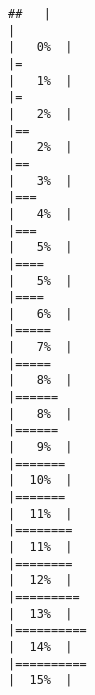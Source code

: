 \documentclass[
]{article}
\begin{document}
\begin{verbatim}
##   |                                                                              |                                                                      |   0%  |                                                                              |=                                                                     |   1%  |                                                                              |=                                                                     |   2%  |                                                                              |==                                                                    |   2%  |                                                                              |==                                                                    |   3%  |                                                                              |===                                                                   |   4%  |                                                                              |===                                                                   |   5%  |                                                                              |====                                                                  |   5%  |                                                                              |====                                                                  |   6%  |                                                                              |=====                                                                 |   7%  |                                                                              |=====                                                                 |   8%  |                                                                              |======                                                                |   8%  |                                                                              |======                                                                |   9%  |                                                                              |=======                                                               |  10%  |                                                                              |=======                                                               |  11%  |                                                                              |========                                                              |  11%  |                                                                              |========                                                              |  12%  |                                                                              |=========                                                             |  13%  |                                                                              |==========                                                            |  14%  |                                                                              |==========                                                            |  15%  |                                                                              
\end{verbatim}
\end{document}
